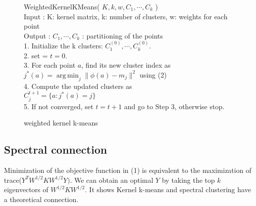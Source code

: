 \begin{figure}[ht]
\begin{mdframed}
WeightedKernelKMeans( $ K, k, w, C_1, \cdots, C_k $ ) \\
Input : K: kernel matrix, k: number of clusters, w: weights for each point \\
Output : $C_1, \cdots, C_k$ : partitioning of the points \\
1. Initialize the k clusters: $C_1^{(0)}, \cdots, C_k^{(0)}$. \\
2. set = $t=0$. \\
3. For each point $a$, find its new cluster index as \\
$j^{*}(a) = \operatorname*{arg\,min}_j \| \phi(a) - m_j \|^2 $ using (2) \\
4. Compute the updated clusters as \\
$C_j^{t+1} = \{ a : j^{*}(a) = j \}$ \\
5. If not converged, set $t = t + 1$ and go to Step 3, otherwise stop.
\end{mdframed}
\caption{weighted kernel k-means}
\end{figure}

\subsection{Spectral connection}
Minimization of the objective function in (1) is equivalent to the maximization of trace($Y^T W^{1/2} K W^{1/2} Y)$. We can obtain an optimal $Y$ by taking the top $k$ eigenvectors of $W^{1/2}K W^{1/2}$. It shows Kernel k-means and spectral clustering have a theoretical connection. 
